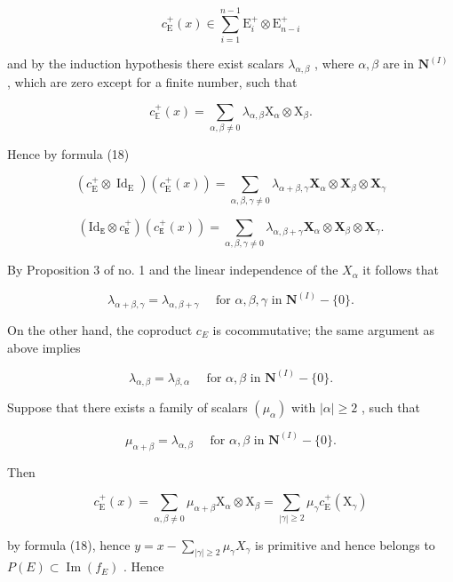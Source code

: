 \[
c _ {\mathrm{E}} ^ {+} (x) \in \sum_ {i = 1} ^ {n - 1} \mathrm{E} _ {i} ^ {+} \otimes \mathrm{E} _ {n - i} ^ {+}
\]

and by the induction hypothesis there exist scalars \(\lambda_{\alpha, \beta}\) , where \(\alpha, \beta\) are in \(\mathbf{N}^{(I)}\) , which are zero except for a finite number, such that

\[
c _ {\mathbb {E}} ^ {+} (x) = \sum_ {\alpha , \beta \neq 0} \lambda_ {\alpha , \beta} \mathrm{X} _ {\alpha} \otimes \mathrm{X} _ {\beta}.\tag{19}
\]

Hence by formula (18)

\[
(c _ {\mathrm{E}} ^ {+} \otimes \operatorname{Id} _ {\mathrm{E}}) (c _ {\mathrm{E}} ^ {+} (x)) = \sum_ {\alpha , \beta , \gamma \neq 0} \lambda_ {\alpha + \beta , \gamma} \mathbf {X} _ {\alpha} \otimes \mathbf {X} _ {\beta} \otimes \mathbf {X} _ {\gamma}
\]

\[
(\mathrm{Id} _ {\mathtt {E}} \otimes c _ {\mathtt {E}} ^ {+}) (c _ {\mathtt {E}} ^ {+} (x)) = \sum_ {\alpha , \beta , \gamma \neq 0} \lambda_ {\alpha , \beta + \gamma} \mathbf {X} _ {\alpha} \otimes \mathbf {X} _ {\beta} \otimes \mathbf {X} _ {\gamma}.
\]

By Proposition 3 of no. 1 and the linear independence of the \(X_{\alpha}\) it follows that

\[
\lambda_ {\alpha + \beta , \gamma} = \lambda_ {\alpha , \beta + \gamma} \quad \text { for } \alpha , \beta , \gamma \text { in } \mathbf {N} ^ {(I)} - \{0 \}.\tag{20}
\]

On the other hand, the coproduct \(c_{E}\) is cocommutative; the same argument as above implies

\[
\lambda_ {\alpha , \beta} = \lambda_ {\beta , \alpha} \quad \text { for } \alpha , \beta \text { in } \mathbf {N} ^ {(I)} - \{0 \}.\tag{21}
\]

Suppose that there exists a family of scalars \((\mu_{\alpha})\) with \(|\alpha| \geqslant 2\) , such that

\[
\mu_ {\alpha + \beta} = \lambda_ {\alpha , \beta} \quad \text { for } \alpha , \beta \text { in } \mathbf {N} ^ {(I)} - \{0 \}.\tag{22}
\]

Then

\[
c _ {\mathrm{E}} ^ {+} (x) = \sum_ {\alpha , \beta \neq 0} \mu_ {\alpha + \beta} \mathrm{X} _ {\alpha} \otimes \mathrm{X} _ {\beta} = \sum_ {| \gamma | \geqslant 2} \mu_ {\gamma} c _ {\mathrm{E}} ^ {+} (\mathrm{X} _ {\gamma})
\]

by formula (18), hence \(y = x - \sum_{|\gamma| \geq 2} \mu_\gamma X_\gamma\) is primitive and hence belongs to \(P(E) \subset \operatorname{Im}(f_E)\) . Hence

